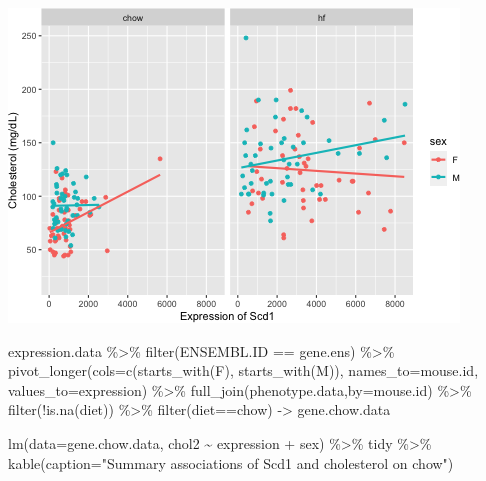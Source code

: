 \documentclass[
]{article}
\newenvironment{Shaded}{\begin{snugshade}}{\end{snugshade}}
\newcommand{\AttributeTok}[1]{\textcolor[rgb]{0.77,0.63,0.00}{#1}}
\newcommand{\FunctionTok}[1]{\textcolor[rgb]{0.00,0.00,0.00}{#1}}
\newcommand{\NormalTok}[1]{#1}
\newcommand{\OtherTok}[1]{\textcolor[rgb]{0.56,0.35,0.01}{#1}}
\newcommand{\SpecialCharTok}[1]{\textcolor[rgb]{0.00,0.00,0.00}{#1}}
\newcommand{\StringTok}[1]{\textcolor[rgb]{0.31,0.60,0.02}{#1}}
\begin{document}
\includegraphics{figures/scd1-associations-1.png}

\begin{Shaded}
\begin{Highlighting}[]
\NormalTok{expression.data }\SpecialCharTok{\%\textgreater{}\%}
  \FunctionTok{filter}\NormalTok{(ENSEMBL.ID }\SpecialCharTok{==}\NormalTok{ gene.ens) }\SpecialCharTok{\%\textgreater{}\%}
  \FunctionTok{pivot\_longer}\NormalTok{(}\AttributeTok{cols=}\FunctionTok{c}\NormalTok{(}\FunctionTok{starts\_with}\NormalTok{(}\StringTok{\textquotesingle{}F\textquotesingle{}}\NormalTok{),}
                      \FunctionTok{starts\_with}\NormalTok{(}\StringTok{\textquotesingle{}M\textquotesingle{}}\NormalTok{)),}
               \AttributeTok{names\_to=}\StringTok{\textquotesingle{}mouse.id\textquotesingle{}}\NormalTok{,}
               \AttributeTok{values\_to=}\StringTok{\textquotesingle{}expression\textquotesingle{}}\NormalTok{) }\SpecialCharTok{\%\textgreater{}\%}
  \FunctionTok{full\_join}\NormalTok{(phenotype.data,}\AttributeTok{by=}\StringTok{\textquotesingle{}mouse.id\textquotesingle{}}\NormalTok{) }\SpecialCharTok{\%\textgreater{}\%}
  \FunctionTok{filter}\NormalTok{(}\SpecialCharTok{!}\FunctionTok{is.na}\NormalTok{(diet)) }\SpecialCharTok{\%\textgreater{}\%}
  \FunctionTok{filter}\NormalTok{(diet}\SpecialCharTok{==}\StringTok{\textquotesingle{}chow\textquotesingle{}}\NormalTok{) }\OtherTok{{-}\textgreater{}}\NormalTok{ gene.chow.data}

\FunctionTok{lm}\NormalTok{(}\AttributeTok{data=}\NormalTok{gene.chow.data, chol2 }\SpecialCharTok{\textasciitilde{}}\NormalTok{ expression }\SpecialCharTok{+}\NormalTok{ sex) }\SpecialCharTok{\%\textgreater{}\%}
\NormalTok{  tidy }\SpecialCharTok{\%\textgreater{}\%}
  \FunctionTok{kable}\NormalTok{(}\AttributeTok{caption=}\StringTok{"Summary associations of Scd1 and cholesterol on chow"}\NormalTok{)}
\end{Highlighting}
\end{Shaded}
\end{document}
